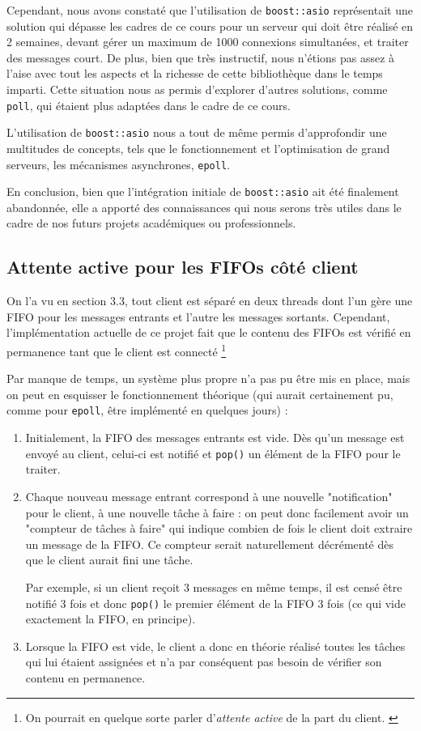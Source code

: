 \documentclass{article}
\begin{document}
Cependant, nous avons constaté que l’utilisation de \texttt{boost::asio} représentait une solution qui dépasse les cadres de ce cours pour un serveur qui doit être réalisé en 2 semaines, devant gérer un maximum de 1000 connexions simultanées, et traiter des messages court. De plus, bien que très instructif, nous n’étions pas assez à l’aise avec tout les aspects et la richesse de cette bibliothèque dans le temps imparti. Cette situation nous as permis d'explorer d’autres solutions, comme \texttt{poll}, qui étaient plus adaptées dans le cadre de ce cours.

L’utilisation de \texttt{boost::asio} nous a tout de même permis d'approfondir une multitudes de concepts, tels que le fonctionnement et l'optimisation de grand serveurs, les mécanismes asynchrones, \texttt{epoll}. 

En conclusion, bien que l’intégration initiale de \texttt{boost::asio} ait été finalement abandonnée, elle a apporté des connaissances qui nous serons très utiles dans le cadre de nos futurs projets académiques ou professionnels.

\subsection{Attente active pour les FIFOs côté client}
\noindent On l'a vu en section 3.3, tout client est séparé en deux threads dont l'un gère une FIFO pour les messages entrants et l'autre les messages sortants. Cependant, l'implémentation actuelle de ce projet fait que le contenu des FIFOs est vérifié en permanence tant que le client est connecté \footnote{On pourrait en quelque sorte parler d'\textit{attente active} de la part du client. \cite{Attente Active} }

\noindent Par manque de temps, un système plus propre n'a pas pu être mis en place, mais on peut en esquisser le fonctionnement théorique (qui aurait certainement pu, comme pour \texttt{epoll}, être implémenté en quelques jours) :
\begin{enumerate}
    \item Initialement, la FIFO des messages entrants est vide. Dès qu'un message est envoyé au client, celui-ci est notifié et \texttt{pop()} un élément de la FIFO pour le traiter. 
    \item Chaque nouveau message entrant correspond à une nouvelle "notification" pour le client, à une nouvelle tâche à faire : on peut donc facilement avoir un "compteur de tâches à faire" qui indique combien de fois le client doit extraire un message de la FIFO. Ce compteur serait naturellement décrémenté dès que le client aurait fini une tâche. 
    
    Par exemple, si un client reçoit 3 messages en même temps, il est censé être notifié 3 fois et donc \texttt{pop()} le premier élément de la FIFO 3 fois (ce qui vide exactement la FIFO, en principe). 
    \item Lorsque la FIFO est vide, le client a donc en théorie réalisé toutes les tâches qui lui étaient assignées et n'a par conséquent pas besoin de vérifier son contenu en permanence.
\end{enumerate}
\end{document}
